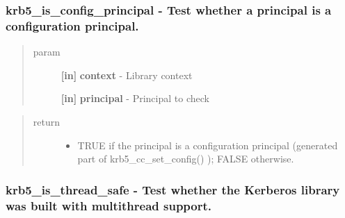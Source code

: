 \documentclass[letterpaper,10pt,english]{sphinxmanual}
\begin{document}
\subsubsection{krb5\_is\_config\_principal -  Test whether a principal is a configuration principal.}
\label{appdev/refs/api/krb5_is_config_principal:krb5-is-config-principal-test-whether-a-principal-is-a-configuration-principal}\label{appdev/refs/api/krb5_is_config_principal::doc}

\begin{fulllineitems}
\label{appdev/refs/api/krb5_is_config_principal:krb5_is_config_principal}
\end{fulllineitems}

\begin{quote}\begin{description}
\item[{param}] \leavevmode
\textbf{{[}in{]}} \textbf{context} - Library context

\textbf{{[}in{]}} \textbf{principal} - Principal to check

\end{description}\end{quote}
\begin{quote}\begin{description}
\item[{return}] \leavevmode\begin{itemize}
\item {} 
TRUE if the principal is a configuration principal (generated part of krb5\_cc\_set\_config() ); FALSE otherwise.

\end{itemize}

\end{description}\end{quote}


\subsubsection{krb5\_is\_thread\_safe -  Test whether the Kerberos library was built with multithread support.}
\label{appdev/refs/api/krb5_is_thread_safe::doc}\label{appdev/refs/api/krb5_is_thread_safe:krb5-is-thread-safe-test-whether-the-kerberos-library-was-built-with-multithread-support}
\end{document}
